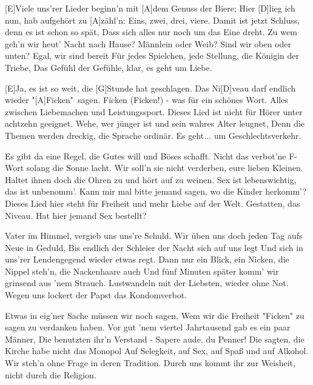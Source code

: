 

\begin{guitar}
	[E]Viele uns'rer Lieder beginn'n mit [A]dem Genuss der Biere;
	Hier [D]lieg ich nun, hab aufgehört zu [A]zähl'n: Eins, zwei, drei, viere.
	Damit ist jetzt Schluss, denn es ist schon so spät,
	Dass sich alles nur noch um das Eine dreht.
	Zu wem geh'n wir heut' Nacht nach Hause? Männlein oder Weib?
	Sind wir oben oder unten? Egal, wir sind bereit
	Für jedes Spielchen, jede Stellung, die Königin der Triebe,
	Das Gefühl der Gefühle, klar, es geht um Liebe.
	
	[E]Ja, es ist so weit, die [G]Stunde hat geschlagen.
	Das Ni[D]veau darf endlich wieder "[A]Ficken"\ sagen.
	Ficken (Ficken!) - was für ein schönes Wort.
	Alles zwischen Liebemachen und Leistungssport.
	Dieses Lied ist nicht für Hörer unter achtzehn geeignet.
	Wehe, wer jünger ist und sein wahres Alter leugnet,
	Denn die Themen werden dreckig, die Sprache ordinär.
	Es geht... um Geschlechtsverkehr.
	
	Es gibt da eine Regel, die Gutes will und Böses schafft.
	Nicht das verbot'ne F-Wort solang die Sonne lacht.
	Wir soll'n sie nicht verderben, eure lieben Kleinen.
	Haltet ihnen doch die Ohren zu und hört auf zu weinen.
	Sex ist lebenswichtig, das ist unbenomm'.
	Kann mir mal bitte jemand sagen, wo die Kinder herkomm'?
	Dieses Lied hier steht für Freiheit und mehr Liebe auf der Welt.
	Gestatten, das Niveau. Hat hier jemand Sex bestellt?
	
	 
	
	\pagebreak
	
	Vater im Himmel, vergieb uns uns're Schuld.
	Wir üben uns doch jeden Tag aufs Neue in Geduld,
	Bis endlich der Schleier der Nacht sich auf uns legt
	Und sich in uns'rer Lendengegend wieder etwas regt.
	Dann nur ein Blick, ein Nicken, die Nippel steh'n, die Nackenhaare auch
	Und fünf Minuten später komm' wir grinsend aus 'nem Strauch.
	Lustwandeln mit der Liebsten, wieder ohne Not.
	Wegen uns lockert der Papst das Kondomverbot.
	
	 
	
	Etwas in eig'ner Sache müssen wir noch sagen,
	Wem wir die Freiheit "Ficken" zu sagen zu verdanken haben.
	Vor gut 'nem viertel Jahrtausend gab es ein paar Männer,
	Die benutzten ihr'n Verstand - Sapere aude, du Penner!
	Die sagten, die Kirche habe nicht das Monopol
	Auf Selegkeit, auf Sex, auf Spaß und auf Alkohol.
	Wir steh'n ohne Frage in deren Tradition.
	Durch uns kommt ihr zur Weisheit, nicht durch die Religion.
	

\end{guitar}
